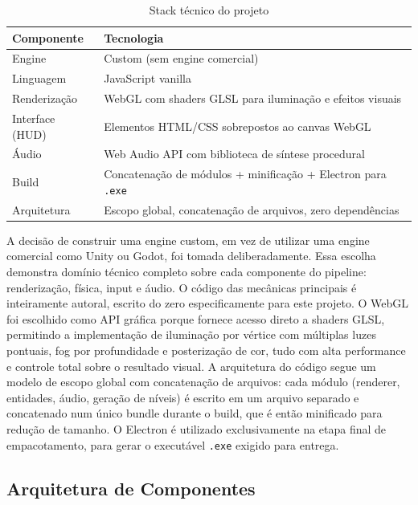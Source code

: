 \documentclass[12pt, a4paper]{article}
\begin{document}
\begin{table}[H]
  \centering
  \caption{Stack t\'ecnico do projeto}
  \begin{tabularx}{0.85\textwidth}{l L}
    \toprule
    \textbf{Componente} & \textbf{Tecnologia} \\
    \midrule
    Engine          & Custom (sem engine comercial) \\
    Linguagem       & JavaScript vanilla \\
    Renderiza\c{c}\~ao & WebGL com shaders GLSL para ilumina\c{c}\~ao e efeitos visuais \\
    Interface (HUD) & Elementos HTML/CSS sobrepostos ao canvas WebGL \\
    \'Audio          & Web Audio API com biblioteca de s\'intese procedural \\
    Build           & Concatena\c{c}\~ao de m\'odulos + minifica\c{c}\~ao + Electron para \texttt{.exe} \\
    Arquitetura     & Escopo global, concatena\c{c}\~ao de arquivos, zero depend\^encias \\
    \bottomrule
  \end{tabularx}
\end{table}

A decis\~ao de construir uma engine custom, em vez de utilizar uma engine comercial como Unity ou Godot, foi tomada deliberadamente. Essa escolha demonstra dom\'inio t\'ecnico completo sobre cada componente do pipeline: renderiza\c{c}\~ao, f\'isica, input e \'audio. O c\'odigo das mec\^anicas principais \'e inteiramente autoral, escrito do zero especificamente para este projeto. O WebGL foi escolhido como API gr\'afica porque fornece acesso direto a shaders GLSL, permitindo a implementa\c{c}\~ao de ilumina\c{c}\~ao por v\'ertice com m\'ultiplas luzes pontuais, fog por profundidade e posteriza\c{c}\~ao de cor, tudo com alta performance e controle total sobre o resultado visual. A arquitetura do c\'odigo segue um modelo de escopo global com concatena\c{c}\~ao de arquivos: cada m\'odulo (renderer, entidades, \'audio, gera\c{c}\~ao de n\'iveis) \'e escrito em um arquivo separado e concatenado num \'unico bundle durante o build, que \'e ent\~ao minificado para redu\c{c}\~ao de tamanho. O Electron \'e utilizado exclusivamente na etapa final de empacotamento, para gerar o execut\'avel \texttt{.exe} exigido para entrega.

\subsection{Arquitetura de Componentes}
\end{document}
